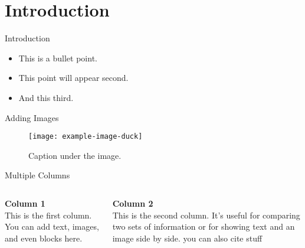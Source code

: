 
% 

\section{Introduction}
\label{sec:introduction}
\frame[plain]{\sectionpage}


\begin{frame}{Introduction}
    \begin{itemize}
        \item<1-> This is a bullet point.
        \item<2-> This point will appear second.
        \item<3-> And this third.
    \end{itemize}
\end{frame}

\begin{frame}{Adding Images}
    \begin{figure}
        \texttt{[image: example-image-duck]}
        \caption{Caption under the image.}
    \end{figure}
\end{frame}

\begin{frame}{Multiple Columns}
    \begin{columns}[T]
        \begin{column}{.48\textwidth}
            \textbf{Column 1}\\
            This is the first column. You can add text, images, and even blocks here.
        \end{column}
        \hfill
        \begin{column}{.48\textwidth}
            \textbf{Column 2}\\
            This is the second column. It's useful for comparing two sets of information or for showing text and an image side by side.
            you can also cite stuff \cite{LeCun2015DeepLearning}
        \end{column}
    \end{columns}
\end{frame}